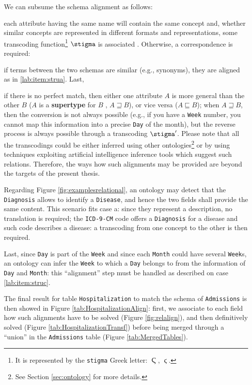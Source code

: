 We can subsume the schema alignment as follows:
\begin{alphalist}
	\item \label{lab:item:strua} each attribute having the same name will contain the same concept and, whether similar concepts are represented in different formats and representations, some transcoding function\footnote{It is represented by the \texttt{stigma} Greek letter: $\Stigma$, $\stigma$. } $\transcoding$ is associated \cite{GolfarelliMPRT12}. Otherwise, a correspondence is required:
	\item \label{lab:item:strub} if terms between the two schemas are similar (e.g., synonyms), they are aligned as in \ref{lab:item:strua}. Last, 
	\item \label{lab:item:struc} if there is no perfect match, then either one attribute $A$ is more general than the other $B$ ($A$ is a \textbf{supertype} for $B$  \cite{deII}, $A\sqsupseteq B$), or vice versa ($A\sqsubseteq B$); when $A\sqsupseteq B$, then the conversion is not always possible (e.g., if you have a \texttt{Week} number, you cannot map this information into a precise \texttt{Day} of the month), but the reverse process is always possible through a transcoding $\transcoding'$. Please note that all the transcodings could be either inferred using other ontologies\footnote{See Section \ref{sec:ontology} for more details.} or by using techniques exploiting artificial intelligence inference tools which suggest such relations. Therefore, the ways how such alignments may be provided are beyond the targets of the present thesis.
\end{alphalist}

\begin{example}[continues=ex:firstThesis]
 Regarding Figure \ref{fig:examplesrelational}, an ontology may detect that the \texttt{Diagnosis} allows to identify a \texttt{Disease}, and hence the two fields shall provide the same content. This scenario fits case a: since they represent a description, no translation is required; the \texttt{ICD-9-CM} code offers a \texttt{Diagnosis} for a disease and such code describes a disease: a transcoding from one concept to the other is then required.

  Last, since \texttt{Day} is part of the \texttt{Week} and since each \texttt{Month} could have several \texttt{Week}s, an ontology can infer the \texttt{Week} to which a \texttt{Day} belongs to from the information of \texttt{Day} and \texttt{Month}: this  ``alignment'' step must be handled as described on case \ref{lab:item:struc}.

  The final result for table \texttt{Hospitalization} to match the schema of \texttt{Admissions} is then showed in Figure \ref{tab:HospitalizationAlign}: first, we associate to each field how such alignments have to be solved (Figure \vref{fig:relalign}), and then definitively solved (Figure \ref{tab:HospitalizationTransf}) before being merged through a ``union'' in the \texttt{Admissions} table (Figure \ref{tab:MergedTables}).
\end{example}




